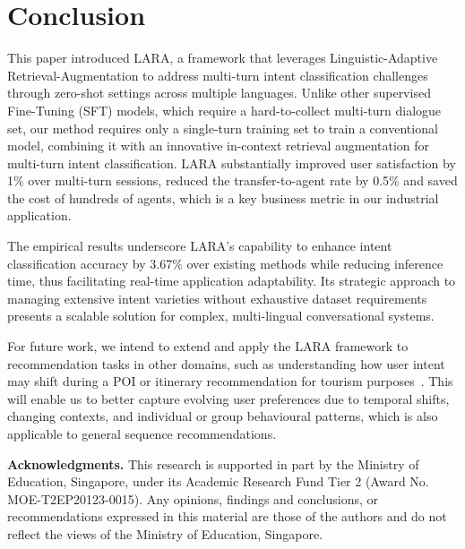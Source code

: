 \section{Conclusion}
This paper introduced LARA, a framework that leverages Linguistic-Adaptive Retrieval-Augmentation to address multi-turn intent classification challenges through zero-shot settings across multiple languages. Unlike other supervised Fine-Tuning (SFT) models, which require a hard-to-collect multi-turn dialogue set, our method requires only a single-turn training set to train a conventional model, combining it with an innovative in-context retrieval augmentation for multi-turn intent classification. LARA substantially improved user satisfaction by 1\% over multi-turn sessions, reduced the transfer-to-agent rate by 0.5\% and saved the cost of hundreds of agents, which is a key business metric in our industrial application.


The empirical results underscore LARA's capability to enhance intent classification accuracy by 3.67\% over existing methods while reducing inference time, thus facilitating real-time application adaptability. Its strategic approach to managing extensive intent varieties without exhaustive dataset requirements presents a scalable solution for complex, multi-lingual conversational systems.

For future work, we intend to extend and apply the LARA framework to recommendation tasks in other domains, such as understanding how user intent may shift during a POI or itinerary recommendation for tourism purposes~\cite{halder2024survey}. This will enable us to better capture evolving user preferences due to temporal shifts, changing contexts, and individual or group behavioural patterns, which is also applicable to general sequence recommendations.

\vspace{3mm}
{
{\noindent\bf Acknowledgments.} 
This research is supported in part by the Ministry of Education, Singapore, under its Academic Research Fund Tier 2 (Award No. MOE-T2EP20123-0015). Any opinions, findings and conclusions, or recommendations expressed in this material are those of the authors and do not reflect the views of the Ministry of Education, Singapore.
}